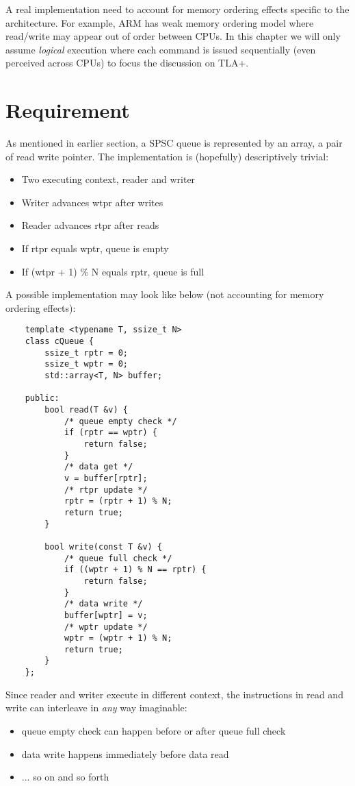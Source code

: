 \documentclass{report}
\begin{document}
A real implementation need to account for memory ordering effects specific to
the architecture. For example, ARM has weak memory ordering model where
read/write may appear out of order between CPUs. In this chapter we will only
assume \textit{logical} execution where each command is issued sequentially
(even perceived across CPUs) to focus the discussion on TLA+.
\section{Requirement}

As mentioned in earlier section, a SPSC queue is represented by an array, a pair
of read write pointer. The implementation is (hopefully) descriptively trivial:

\begin{itemize}
    \item Two executing context, reader and writer
    \item Writer advances wtpr after writes
    \item Reader advances rtpr after reads
    \item If rtpr equals wptr, queue is empty
    \item If (wtpr + 1) \% N equals rptr, queue is full
\end{itemize}

A possible implementation may look like below (not accounting for memory
ordering effects):
\begin{lstlisting}
    template <typename T, ssize_t N>
    class cQueue { 
        ssize_t rptr = 0;
        ssize_t wptr = 0; 
        std::array<T, N> buffer;

    public:
        bool read(T &v) { 
            /* queue empty check */
            if (rptr == wptr) { 
                return false;
            }
            /* data get */
            v = buffer[rptr]; 
            /* rtpr update */
            rptr = (rptr + 1) % N;
            return true;
        }

        bool write(const T &v) { 
            /* queue full check */
            if ((wptr + 1) % N == rptr) { 
                return false;
            }
            /* data write */
            buffer[wptr] = v;
            /* wptr update */
            wptr = (wptr + 1) % N;
            return true;
        }
    };
\end{lstlisting}

Since reader and writer execute in different context, the instructions in read
and write can interleave in \textit{any} way imaginable:
\begin{itemize}
    \item queue empty check can happen before or after queue full check
    \item data write happens immediately before data read
    \item ... so on and so forth
\end{itemize}
\end{document}
